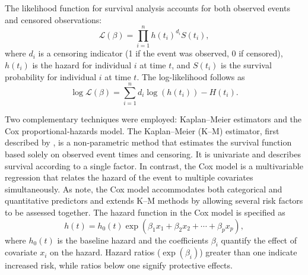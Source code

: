 \documentclass[12pt]{article}
\begin{document}
The likelihood function for survival analysis accounts for both observed events and censored observations:
\[ \mathcal{L}(\beta) = \prod_{i=1}^{n} h(t_{i})^{d_{i}} S(t_{i}), \]
where \(d_i\) is a censoring indicator (1 if the event was observed, 0 if censored), \(h(t_i)\) is the hazard for individual \(i\) at time \(t\), and \(S(t_i)\) is the survival probability for individual \(i\) at time \(t\).  The log-likelihood follows as
\[ \log\mathcal{L}(\beta) = \sum_{i=1}^n d_i \log(h(t_i)) - H(t_i). \]

Two complementary techniques were employed: Kaplan–Meier estimators and the Cox proportional‑hazards model.  The Kaplan–Meier (K–M) estimator, first described by \citet{dudley2016kaplan}, is a non‑parametric method that estimates the survival function based solely on observed event times and censoring.  It is univariate and describes survival according to a single factor.  In contrast, the Cox model is a multivariable regression that relates the hazard of the event to multiple covariates simultaneously.  As \citet{sthda_cox} note, the Cox model accommodates both categorical and quantitative predictors and extends K–M methods by allowing several risk factors to be assessed together.  The hazard function in the Cox model is specified as
\[ h(t) = h_0(t) \exp(\beta_1 x_1 + \beta_2 x_2 + \cdots + \beta_p x_p), \]
where \(h_0(t)\) is the baseline hazard and the coefficients \(\beta_i\) quantify the effect of covariate \(x_i\) on the hazard.  Hazard ratios (\(\exp(\beta_i)\)) greater than one indicate increased risk, while ratios below one signify protective effects.
\end{document}
